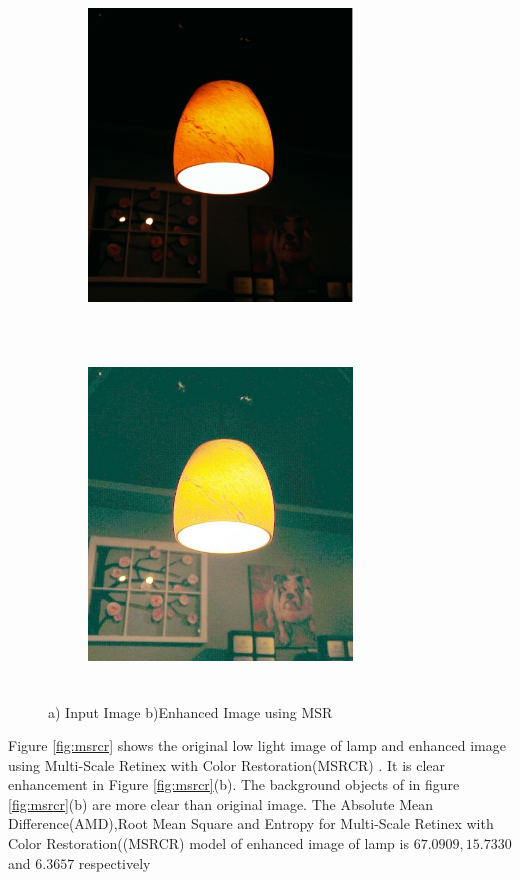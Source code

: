 \begin{figure}[!htb]
	\begin{subfigure}{8cm}
		\centering    
    	\includegraphics[width=7cm,height=9cm,keepaspectratio]{images/ch5/bulb_input.jpg}
    	\caption{} 
    \end{subfigure}
  	\begin{subfigure}{6cm}
  		\centering
  		\includegraphics[width=7cm,height=9cm,keepaspectratio]{images/ch5/bulb_msr.jpg}
   		\caption{}
  	\end{subfigure}
  	\caption{a) Input Image b)Enhanced Image using MSR}
  	\label{fig:msr}
\end{figure}

Figure \ref{fig:msrcr} shows the original low light image of lamp and enhanced image using Multi-Scale Retinex with Color Restoration(MSRCR) . It is clear enhancement in Figure \ref{fig:msrcr}(b). The background objects of in figure \ref{fig:msrcr}(b) are more clear than original image. The Absolute Mean Difference(AMD),Root Mean Square and Entropy for Multi-Scale Retinex with Color Restoration((MSRCR) model of enhanced image of lamp is $67.0909,15.7330$ and $6.3657$ respectively      

